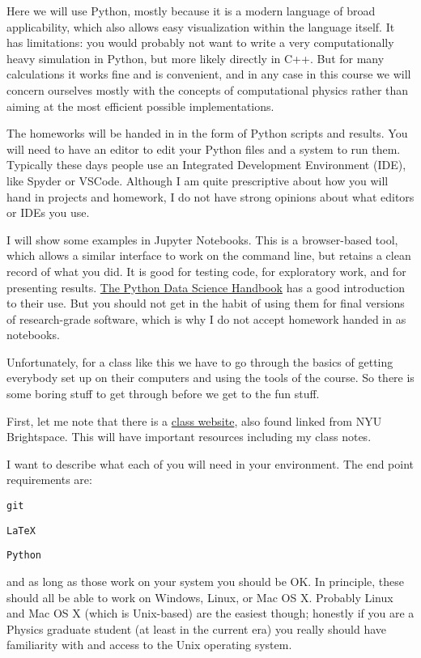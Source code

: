 Here we will use Python, mostly because it is a modern language of
broad applicability, which also allows easy visualization within the
language itself. It has limitations: you would probably not want to
write a very computationally heavy simulation in Python, but more
likely directly in C++. But for many calculations it works fine and is
convenient, and in any case in this course we will concern ourselves
mostly with the concepts of computational physics rather than aiming
at the most efficient possible implementations.

The homeworks will be handed in in the form of Python scripts and
results. You will need to have an editor to edit your Python files and
a system to run them. Typically these days people use an Integrated
Development Environment (IDE), like Spyder or VSCode. Although I am
quite prescriptive about how you will hand in projects and homework, I
do not have strong opinions about what editors or IDEs you use.

I will show some examples in Jupyter Notebooks.  This is a
browser-based tool, which allows a similar interface to work on the
command line, but retains a clean record of what you did. It is good
for testing code, for exploratory work, and for presenting
results. \href{https://github.com/jakevdp/PythonDataScienceHandbook/tree/de0cc6bd317012d50ab3dd06e3cf4e256de1973f/notebooks}{The
Python Data Science Handbook} has a good introduction to their
use. But you should not get in the habit of using them for final
versions of research-grade software, which is why I do not accept
homework handed in as notebooks.

Unfortunately, for a class like this we have to go through the basics
of getting everybody set up on their computers and using the tools of
the course. So there is some boring stuff to get through before we get
to the fun stuff. 

First, let me note that there is a
\href{https://blanton144.github.io/computational-grad/}{\color{red} class
  website}, also found linked from NYU Brightspace. This will have
important resources including my class notes.

I want to describe what each of you will need in your environment. The
end point requirements are:
\begin{ditemize}
\item {\tt git}
\item {\tt \LaTeX}
\item {\tt Python}
\end{ditemize}
and as long as those work on your system you should be OK. In
principle, these should all be able to work on Windows, Linux, or Mac
OS X. Probably Linux and Mac OS X (which is Unix-based) are the
easiest though; honestly if you are a Physics graduate student (at
least in the current era) you really should have familiarity with and
access to the Unix operating system.

